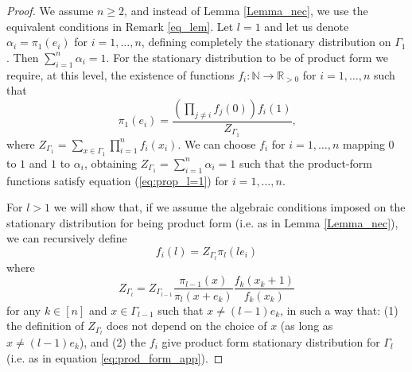 \documentclass{amsart}
\theoremstyle{definition}
\theoremstyle{remark}
\theoremstyle{Conjecture/open problem}
\theoremstyle{assumption}
\theoremstyle{conjecture}
\def\Ga{\Gamma}
\numberwithin{equation}{section}
\begin{document}
\begin{proof}

We assume $n\geq 2$, and instead of Lemma \ref{Lemma_nec}, we use the equivalent conditions in Remark \ref{eq_lem}. Let $l=1$ and let us denote $\alpha _i=\pi _1(e_i)$ for $i=1,\ldots ,n$, defining completely the stationary distribution on $\Gamma _1$. Then $\sum _{i=1}^n \alpha _i=1$. For the stationary distribution to be of product form we require, at this level, the existence of functions $f_i:\mathbb{N}\longrightarrow \mathbb{R}_{>0}$ for $i=1,\ldots ,n$ such that 
\begin{equation}\label{eq:prop_l=1}\pi _1(e_i)=\frac{\left( \prod _{j\neq i}f_j(0)\right) f_i(1)}{Z_{\Gamma _1}}\mbox{,}\end{equation}
where $Z_{\Gamma _1}=\sum _{x\in \Gamma _1}\prod _{i=1}^nf_i(x_i)$. We can choose $f_i$ for $i=1,\ldots ,n$ mapping $0$ to $1$ and $1$ to $\alpha _i$, obtaining $Z_{\Gamma _1}=\sum _{i=1}^n\alpha _i=1$ such that the product-form functions satisfy equation (\ref{eq:prop_l=1}) for $i=1,\ldots ,n$.

For $l>1$ we will show that, if we assume the algebraic conditions imposed on the stationary distribution for being product form (i.e. as in Lemma \ref{Lemma_nec}), we can recursively define 
\begin{equation}\label{eq:def_f_i}f_i(l)=Z_{\Gamma _l}\pi _l(le_i)\end{equation}
where
\begin{equation}\label{eq:def_Z_l}Z_{\Gamma _l}=Z_{\Gamma _{l-1}}\frac{\pi _{l-1}(x)}{\pi _l(x+e_k)}\frac{f_k(x_k+1)}{f_k(x_k)}\end{equation}
for any $k\in [n]$ and $x\in \Gamma _{l-1}$ such that $x\neq (l-1)e_k$, in such a way that: (1) the definition of $Z_{\Gamma _l}$ does not depend on the choice of $x$ (as long as $x\neq (l-1)e_k$), and (2) the $f_i$ give product form stationary distribution for $\Ga_l$ (i.e. as in equation \eqref{eq:prod_form_app}).


\end{proof}
\end{document}
